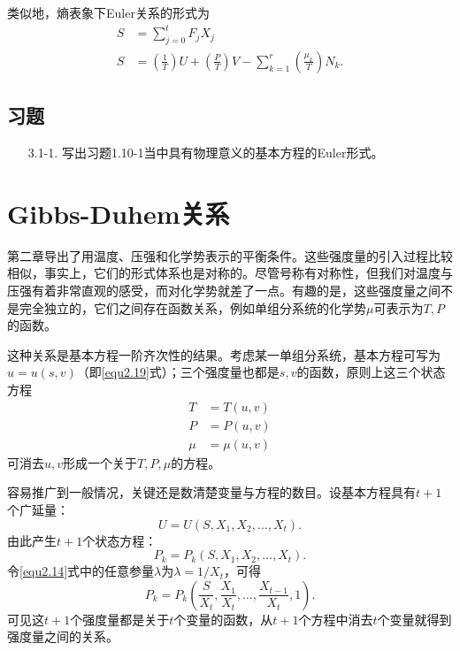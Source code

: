 类似地，熵表象下Euler关系的形式为
\begin{align}
    S &= \sum_{j = 0}^t F_j X_j \label{equ3.7} \\
    S &= \left(\frac{1}{T} \right) U + \left( \frac{P}{T} \right) V - \sum_{k = 1}^r \left( \frac{\mu_k}{T} \right) N_k. \label{equ3.8}
\end{align}

\subsection*{习题}
\begin{itemize}
\item[3.1-1.] 写出习题1.10-1当中具有物理意义的基本方程的Euler形式。
\end{itemize}

\section{Gibbs-Duhem关系}
\label{sec3.2}
第二章导出了用温度、压强和化学势表示的平衡条件。这些强度量的引入过程比较相似，事实上，它们的形式体系也是对称的。尽管号称有对称性，但我们对温度与压强有着非常直观的感受，而对化学势就差了一点。有趣的是，这些强度量之间不是完全独立的，它们之间存在函数关系，例如单组分系统的化学势$\mu$可表示为$T, P$的函数。

这种关系是基本方程一阶齐次性的结果。考虑某一单组分系统，基本方程可写为$u = u(s, v)$（即\eqref{equ2.19}式）；三个强度量也都是$s, v$的函数，原则上这三个状态方程
\begin{align*}
    T &= T(u, v) \\
    P &= P(u, v) \\
    \mu &= \mu (u, v)
\end{align*}
可消去$u, v$形成一个关于$T, P, \mu$的方程。

容易推广到一般情况，关键还是数清楚变量与方程的数目。设基本方程具有$t + 1$个广延量：
\begin{equation}
\label{equ3.9}
    U = U(S, X_1, X_2, \dots, X_t).
\end{equation}
由此产生$t + 1$个状态方程：
\begin{equation}
\label{equ3.10}
    P_k = P_k(S, X_1, X_2, \dots, X_t).
\end{equation}
令\eqref{equ2.14}式中的任意参量$\lambda$为$\lambda = 1 / X_t$，可得
\begin{equation}
\label{equ3.11}
	P_k = P_k \left( \frac{S}{X_t}, \frac{X_1}{X_t}, \dots, \frac{X_{t-1}}{X_t}, 1 \right).
\end{equation}
可见这$t + 1$个强度量都是关于$t$个变量的函数，从$t + 1$个方程中消去$t$个变量就得到强度量之间的关系。

